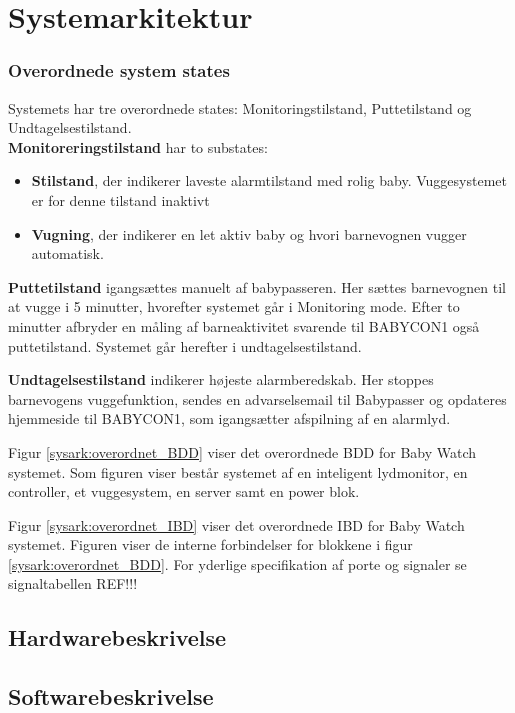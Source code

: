 \chapter{Systemarkitektur}



\subsection{Overordnede system states}


Systemets har tre overordnede states: Monitoringstilstand, Puttetilstand og Undtagelsestilstand. \\\textbf{Monitoreringstilstand} har to substates: 
\begin{itemize}
	\item \textbf{Stilstand}, der indikerer laveste alarmtilstand med rolig baby. Vuggesystemet er for denne tilstand inaktivt
	\item \textbf{Vugning}, der indikerer en let aktiv baby og hvori barnevognen vugger automatisk.
\end{itemize}

\textbf{Puttetilstand} igangsættes manuelt af babypasseren. Her sættes barnevognen til at vugge i 5 minutter, hvorefter systemet går i Monitoring mode. Efter to minutter afbryder en måling af barneaktivitet svarende til BABYCON1 også puttetilstand. Systemet går herefter i undtagelsestilstand.

\textbf{Undtagelsestilstand} indikerer højeste alarmberedskab. Her stoppes barnevogens vuggefunktion, sendes en advarselsemail til Babypasser og opdateres hjemmeside til BABYCON1, som igangsætter afspilning af en alarmlyd. 

Figur \ref{sysark:overordnet_BDD} viser det overordnede BDD for Baby Watch systemet. Som figuren viser består systemet af en inteligent lydmonitor, en controller, et vuggesystem, en server samt en power blok. 


Figur \ref{sysark:overordnet_IBD} viser det overordnede IBD for Baby Watch systemet.  Figuren viser de interne forbindelser for blokkene i figur \ref{sysark:overordnet_BDD}. For yderlige specifikation af porte og signaler se signaltabellen REF!!!

\newpage
\section{Hardwarebeskrivelse}


\clearpage
\section{Softwarebeskrivelse}



